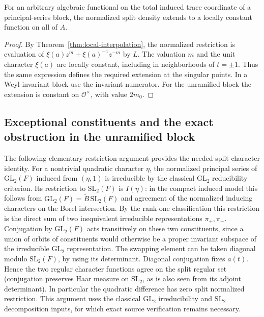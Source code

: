 \begin{theorem}\label{thm:induced-descent}
For an arbitrary algebraic functional on the total induced trace coordinate of a principal-series block, the normalized split density extends to a locally constant function on all of $A$.
\end{theorem}
\begin{proof}
By Theorem~\ref{thm:local-interpolation}, the normalized restriction is evaluation of $\xi(a)z^m+\xi(a)^{-1}z^{-m}$ by $L$. The valuation $m$ and the unit character $\xi(a)$ are locally constant, including in neighborhoods of $t=\pm1$. Thus the same expression defines the required extension at the singular points. In a Weyl-invariant block use the invariant numerator. For the unramified block the extension is constant on $\mathcal O^\times$, with value $2m_0$.
\end{proof}

\subsection{Exceptional constituents and the exact obstruction in the unramified block}
The following elementary restriction argument provides the needed split character identity. For a nontrivial quadratic character $\eta$, the normalized principal series of $\mathrm{GL}_2(F)$ induced from $(\eta,1)$ is irreducible by the classical $\mathrm{GL}_2$ reducibility criterion. Its restriction to $\mathrm{SL}_2(F)$ is $I(\eta)$: in the compact induced model this follows from $\mathrm{GL}_2(F)=\widetilde B\,\mathrm{SL}_2(F)$ and agreement of the normalized inducing characters on the Borel intersection. By the rank-one classification this restriction is the direct sum of two inequivalent irreducible representations $\pi_+,\pi_-$. Conjugation by $\mathrm{GL}_2(F)$ acts transitively on these two constituents, since a union of orbits of constituents would otherwise be a proper invariant subspace of the irreducible $\mathrm{GL}_2$ representation. The swapping element can be taken diagonal modulo $\mathrm{SL}_2(F)$, by using its determinant. Diagonal conjugation fixes $a(t)$. Hence the two regular character functions agree on the split regular set (conjugation preserves Haar measure on $\mathrm{SL}_2$, as is also seen from its adjoint determinant). In particular the quadratic difference has zero split normalized restriction. This argument uses the classical $\mathrm{GL}_2$ irreducibility and $\mathrm{SL}_2$ decomposition inputs, for which exact source verification remains necessary.

